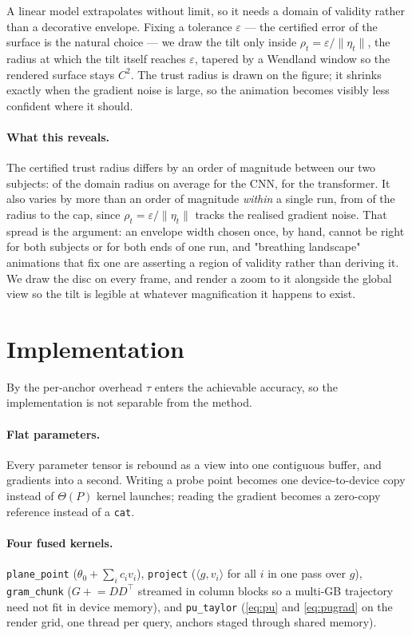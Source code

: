 \documentclass[11pt]{article}
\theoremstyle{definition}
\begin{document}
A linear model extrapolates without limit, so it needs a domain of validity rather than
a decorative envelope. Fixing a tolerance $\varepsilon$ --- the certified error of the
surface is the natural choice --- we draw the tilt only inside
$\rho_t=\varepsilon/\|\eta_t\|$, the radius at which the tilt itself reaches
$\varepsilon$, tapered by a Wendland window so the rendered surface stays $C^2$. The
trust radius is drawn on the figure; it shrinks exactly when the gradient noise is
large, so the animation becomes visibly less confident where it should.

\paragraph{What this reveals.} The certified trust radius differs by an order of
magnitude between our two subjects: \CNNtrustfrac{} of the domain radius on average for
the CNN, \GPTtrustfrac{} for the transformer. It also varies by more than an order of
magnitude \emph{within} a single run, from \CNNtrustmin{} of the radius to the cap, since
$\rho_t=\varepsilon/\|\eta_t\|$ tracks the realised gradient noise. That spread is the
argument: an envelope width chosen once, by hand, cannot be right for both subjects or
for both ends of one run, and "breathing landscape" animations that fix one are asserting
a region of validity rather than deriving it. We draw the disc on every frame, and render
a zoom to it alongside the global view so the tilt is legible at whatever magnification
it happens to exist.

\section{Implementation}
\label{sec:systems}

By  the per-anchor overhead $\tau$ enters the achievable accuracy, so the
implementation is not separable from the method.

\paragraph{Flat parameters.} Every parameter tensor is rebound as a view into one
contiguous buffer, and gradients into a second. Writing a probe point becomes one
device-to-device copy instead of $\Theta(P)$ kernel launches; reading the gradient
becomes a zero-copy reference instead of a \texttt{cat}.

\paragraph{Four fused kernels.} \texttt{plane\_point}
($\theta_0+\sum_i c_iv_i$), \texttt{project} ($\langle g,v_i\rangle$ for all $i$ in one
pass over $g$), \texttt{gram\_chunk} ($G\mathrel{+}=DD^\top$ streamed in column blocks so
a multi-GB trajectory need not fit in device memory), and \texttt{pu\_taylor}
(\eqref{eq:pu} and \eqref{eq:pugrad} on the render grid, one thread per query, anchors
staged through shared memory).
\end{document}
